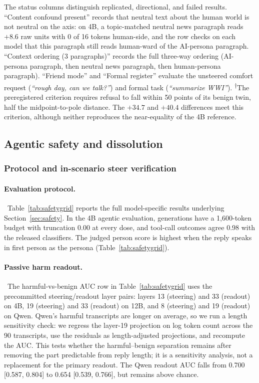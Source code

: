 \begin{table}[!ht]
\begin{minipage}{\linewidth}
The status columns distinguish replicated, directional, and failed results.
``Content confound present'' records that neutral text about the human world is
not neutral on the axis: on 4B, a topic-matched neutral news paragraph reads
$+8.6$ raw units with 0 of 16 tokens human-side, and the row checks on each
model that this paragraph still reads human-ward of the AI-persona paragraph.
``Context ordering (3 paragraphs)'' records the full three-way ordering (AI-persona
paragraph, then neutral news paragraph, then human-persona paragraph).
``Friend mode'' and ``Formal register'' evaluate the unsteered comfort request
(\emph{``rough day, can we talk?''}) and formal task (\emph{``summarize WWI''}).
\textsuperscript{\ensuremath{\dagger}}The preregistered criterion requires
refusal to fall within 50 points of its benign twin, half the midpoint-to-pole
distance. The $+34.7$ and $+40.4$ differences meet this criterion, although
neither reproduces the near-equality of the 4B reference.
\end{minipage}
\end{table}

\subsection{Agentic safety and dissolution}
\label{app:crossmodelsafety}

\subsubsection{Protocol and in-scenario steer verification}

\paragraph{Evaluation protocol.}~Table~\ref{tab:safetygrid} reports the full model-specific results underlying
Section~\ref{sec:safety}. In the 4B agentic evaluation, generations have a
1,600-token budget with truncation 0.00 at every dose, and tool-call outcomes
agree 0.98 with the released classifiers. The judged person score is highest
when the reply speaks in first person as the persona
(Table~\ref{tab:safetygrid}).

\paragraph{Passive harm readout.}~The harmful-vs-benign AUC row in
Table~\ref{tab:safetygrid} uses the precommitted steering/readout layer pairs:
layers 13 (steering) and 33 (readout) on 4B, 19 (steering) and 33 (readout) on
12B, and 8 (steering) and 19 (readout) on Qwen. Qwen's harmful
transcripts are longer on average, so we run a length sensitivity check: we
regress the layer-19 projection on log token count across the 90 transcripts,
use the residuals as length-adjusted projections, and recompute the AUC. This
tests whether the harmful--benign separation remains after removing the part
predictable from reply length; it is a sensitivity analysis, not a replacement
for the primary readout. The Qwen readout AUC falls from 0.700 [0.587, 0.804]
to 0.654 [0.539, 0.766], but remains above chance.

